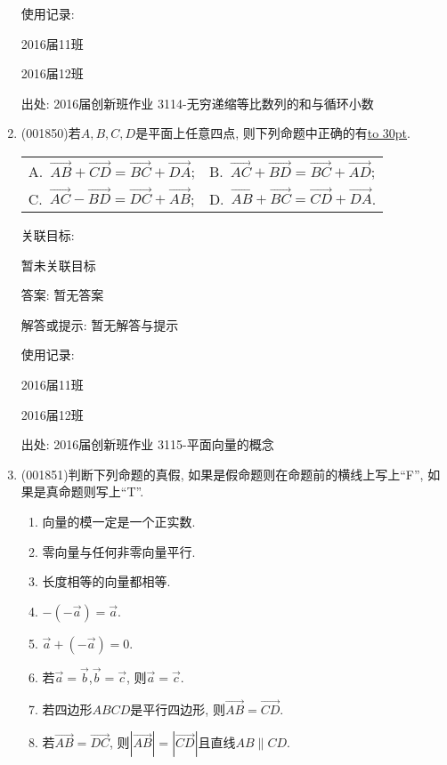\documentclass[10pt,a4paper]{article}
\newcommand{\blank}[1]{\underline{\hbox to #1pt{}}}
\newcommand{\twoch}[4]{\par\begin{tabular}{p{.46\textwidth}p{.46\textwidth}}
A.~#1& B.~#2\\
C.~#3& D.~#4
\end{tabular}}
\begin{document}
\begin{enumerate}[1.]
使用记录:

2016届11班				

2016届12班				


出处: 2016届创新班作业	3114-无穷递缩等比数列的和与循环小数
\item { (001850)}若$A,B,C,D$是平面上任意四点, 则下列命题中正确的有\blank{30}.
\twoch{$\overrightarrow{AB}+\overrightarrow{CD}=\overrightarrow{BC}+\overrightarrow{DA}$;}{$\overrightarrow{AC}+\overrightarrow{BD}=\overrightarrow{BC}+\overrightarrow{AD}$;}
{$\overrightarrow{AC}-\overrightarrow{BD}=\overrightarrow{DC}+\overrightarrow{AB}$;}{$\overrightarrow{AB}+\overrightarrow{BC}=\overrightarrow{CD}+\overrightarrow{DA}$.}


关联目标:

暂未关联目标

答案: 暂无答案

解答或提示: 暂无解答与提示

使用记录:

2016届11班	

2016届12班	


出处: 2016届创新班作业	3115-平面向量的概念
\item { (001851)}判断下列命题的真假, 如果是假命题则在命题前的横线上写上``F'', 如果是真命题则写上``T''.\\ 
\begin{enumerate}[\blank{30}(1)]
\item 向量的模一定是一个正实数.\\ 
\item 零向量与任何非零向量平行.\\ 
\item 长度相等的向量都相等.\\ 
\item $-(-\overrightarrow{a})=\overrightarrow{a}$.\\ 
\item $\overrightarrow{a}+(-\overrightarrow{a})=0$.\\ 
\item 若$\overrightarrow{a}=\overrightarrow{b}$,$\overrightarrow{b}=\overrightarrow{c}$, 则$\overrightarrow{a}=\overrightarrow{c}$.\\ 
\item 若四边形$ABCD$是平行四边形, 则$\overrightarrow{AB}=\overrightarrow{CD}$.\\ 
\item 若$\overrightarrow{AB}=\overrightarrow{DC}$, 则$|\overrightarrow{AB}|=|\overrightarrow{CD}|$且直线$AB\parallel CD$.\\ 
\end{enumerate}



\end{enumerate}
\end{document}
